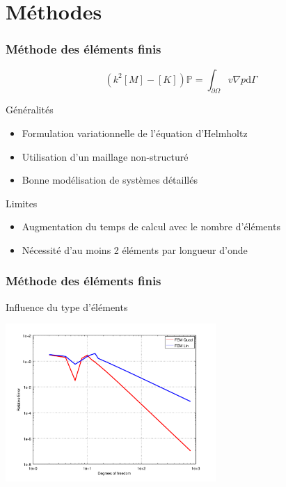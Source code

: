 \documentclass[10pt, compress]{beamer}
\newcommand\GP{\mathbb{P}}
\begin{document}
\section{Méthodes}

\begin{frame}
	\frametitle{Méthode des éléments finis}

	$$\left(k^2[M] - [K]\right)\GP = \int_{\partial\Omega} v\nabla p\mathrm{d}\Gamma$$

	\begin{block}{Généralités}
		\begin{itemize}
			\item Formulation variationnelle de l'équation d'Helmholtz
			\item Utilisation d'un maillage non-structuré
			\item Bonne modélisation de systèmes détaillés
		\end{itemize}
	\end{block}
	\pause
	\begin{block}{Limites}
		\begin{itemize}
			\item Augmentation du temps de calcul avec le nombre d'éléments
			\item Nécessité d'au moins 2 éléments par longueur d'onde
		\end{itemize}
	\end{block}
\end{frame}

\begin{frame}
	\frametitle{Méthode des éléments finis}

	\begin{block}{Influence du type d'éléments}
		\begin{center}
		\includegraphics[width=0.6\textwidth]{../report/part1/figs/FEM/simuls_1D/convergence.png}
		\end{center}
	\end{block}
\end{frame}
\end{document}
